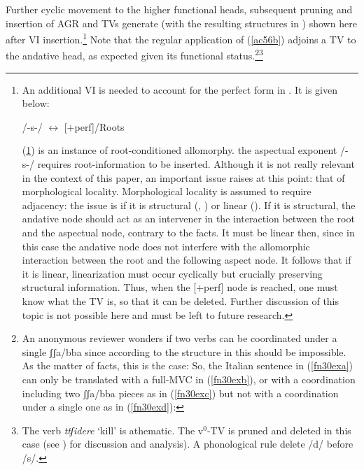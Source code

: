 \documentclass[output=paper]{langscibook}
\begin{document}
Further cyclic movement to the higher functional heads, subsequent pruning and insertion of AGR and TVs generate  (with the resulting structures in ) shown here after VI insertion.\footnote{An additional VI is needed to account for the perfect form in .  It is given below:

\ea \label{fn29ex} /-s-/ $\longleftrightarrow$ [+perf]/Roots \underline{\hspace{2em}}
\z

(\ref{fn29ex}) is an instance of root-conditioned allomorphy. the aspectual exponent /-s-/ requires root-information to be inserted. Although it is not really relevant in the context of this paper, an important issue raises at this point: that of morphological locality.  Morphological locality is assumed to require adjacency: the issue is if it is structural (\cite{bobaljik2012a}, \cite{calabrese2019a}) or linear (\cite{embick2010a}).  If it is structural, the andative node should act as an intervener in the interaction between the root and the aspectual node, contrary to the facts. It must be linear then, since in this case the andative node does not interfere with the allomorphic interaction between the root and the following aspect node. It follows that if it is linear, linearization must occur cyclically but crucially preserving structural information. Thus, when the [+perf] node is reached, one must know what the TV is, so that it can be deleted. Further discussion of this topic is not possible here and must be left to future research.} Note that the regular application of (\ref{ac56b}) adjoins a TV to the andative head, as expected given its functional status.\footnote{An anonymous reviewer wonders if two verbs can be coordinated under a single ʃʃa/bba since according to the structure in  this should be impossible. As the matter of facts, this is the case: So, the Italian sentence in (\ref{fn30exa}) can only be translated with a full-MVC in (\ref{fn30exb}), or with a coordination including two ʃʃa/bba pieces as in (\ref{fn30exc}) but not with a coordination under a single one as in (\ref{fn30exd}):

\z
}\footnote{The verb \textit{ttʃidere} ‘kill’ is athematic. The v$^0$-TV is pruned and deleted in this case (see \cite{calabrese2015a, calabrese2019a}) for discussion and analysis).  A phonological rule delete /d/ before /s/.
}
\end{document}
